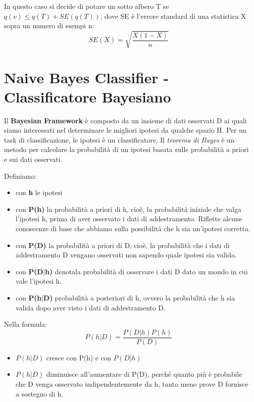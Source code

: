 \documentclass[a4paper]{extarticle}
\begin{document}
In questo caso si decide di potare un sotto albero T se $q(v) \leq q(T) + SE(q(T))$, dove SE è l'errore standard di una statistica X sopra un numero di esempi n:
\begin{equation*}
SE(X) = \sqrt{\dfrac{X(1-X)}{n}}
\end{equation*}

\section{Naive Bayes Classifier - Classificatore Bayesiano}

Il \textbf{Bayesian Framework} è composto da un insieme di dati osservati D ai quali siamo interessati nel determinare le migliori ipotesi da qualche spazio H. Per un task di classificazione, le ipotesi è un classificatore. Il \textit{teorema di Bayes} è un metodo per calcolare la probabilità di un ipotesi basata sulle probabilità a priori e sui dati osservati.

Definiamo:
\begin{itemize}
\item con \textbf{h} le ipotesi

\item con \textbf{P(h)} la probabilità a priori di h, cioè, la probabilità iniziale che valga l'ipotesi h, prima di aver osservato i dati di addestramento. Riflette alcune conoscenze di base che abbiamo sulla possibilità che h sia un'ipotesi corretta.

\item con \textbf{P(D)} la probabilità a priori di D, cioè, la probabilità che i dati di addestramento D vengano osservati non sapendo quale ipotesi sia valida.

\item con \textbf{P(D$|$h)} denotala probabilità di osservare i dati D dato un mondo in cui vale l'ipotesi h.

\item con \textbf{P(h$|$D)} probabilità a posteriori di h, ovvero la probabilità che h sia valida dopo aver visto i dati di addestramento D.
\end{itemize}

Nella formula:
\begin{equation*}
P(h|D) = \dfrac{P(D|h)P(h)}{P(D)}
\end{equation*}

\begin{itemize}
\item $P(h|D)$ cresce con P(h) e con $P(D|h)$
\item $P(h|D)$ diminuisce all'aumentare di P(D), perché quanto più è probabile che D venga osservato indipendentemente da h, tanto meno prove D fornisce a sostegno di h.
\end{itemize}
\end{document}
